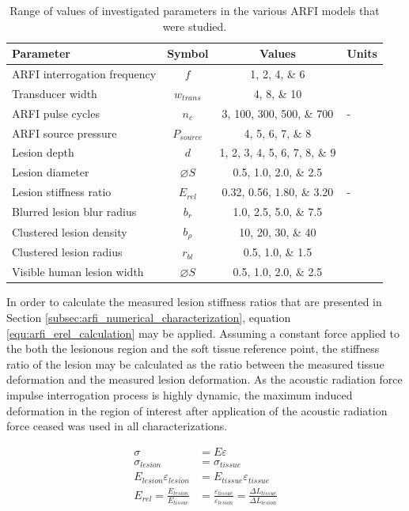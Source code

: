 			\begin{table}[!htb]
				\centering
				\caption[ARFI model investigated parameters]{Range of values of investigated parameters in the various ARFI models that were studied.}
				\label{tab:arfi-parametervalues}
				\begin{tabular}{lccs[table-unit-alignment = left]}
					\toprule
					Parameter & Symbol & Values & {Units} \\
					\midrule
					ARFI interrogation frequency & $f$ & \numlist{1;2;4;6} & \MHz \\
					Transducer width & $w_{trans}$ & \numlist{4;8;10} & \cm \\
					ARFI pulse cycles & $n_c$ & \numlist{3;100;300;500;700} & - \\
					ARFI source pressure & $P_{source}$ & \numlist{4;5;6;7;8} & \MPa \\
					Lesion depth & $d$ & \numlist{1;2;3;4;5;6;7;8;9} & \cm \\
					Lesion diameter & $\diameter S$ & \numlist{0.5;1.0;2.0;2.5} & \cm \\
					Lesion stiffness ratio & $E_{rel}$ & \numlist{0.32;0.56;1.80;3.20} & - \\
					Blurred lesion blur radius & $b_r$ & \numlist{1.0;2.5;5.0;7.5} & \mm \\
					Clustered lesion density & $b_\rho$ & \numlist{10;20;30;40} & \per\cm\squared \\
					Clustered lesion radius & $r_{bl}$ & \numlist{0.5;1.0;1.5} & \mm \\
					Visible human lesion width & $\diameter S$ & \numlist{0.5;1.0;2.0;2.5} & \cm \\
					\bottomrule
				\end{tabular}
			\end{table}

			In order to calculate the measured lesion stiffness ratios that are presented in Section \ref{subsec:arfi_numerical_characterization}, equation \ref{equ:arfi_erel_calculation} may be applied. Assuming a constant force applied to the both the lesionous region and the soft tissue reference point, the stiffness ratio of the lesion may be calculated as the ratio between the measured tissue deformation and the measured lesion deformation. As the acoustic radiation force impulse interrogation process is highly dynamic, the maximum induced deformation in the region of interest after application of the acoustic radiation force ceased was used in all characterizations.

			\begin{subequations}
				\label{equ:arfi_erel_calculation}
				\begin{align}
					\sigma &= E \varepsilon \\
					\sigma_{lesion} &= \sigma_{tissue} \\
					E_{lesion} \varepsilon_{lesion} &= E_{tissue} \varepsilon_{tissue} \\
					E_{rel} = \frac{E_{lesion}}{E_{tissue}} &= \frac{\varepsilon_{tissue}}{\varepsilon_{lesion}} = \frac{\Delta L_{tissue}}{\Delta L_{lesion}}
				\end{align}
			\end{subequations}

